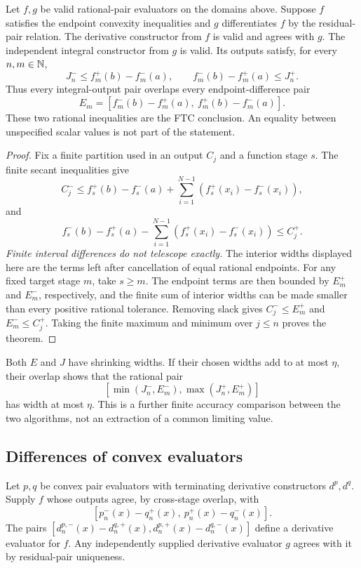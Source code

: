 \begin{theorem}
\label{thm:ftc-finite-output}
Let $f,g$ be valid rational-pair evaluators on the domains above.  Suppose
$f$ satisfies the endpoint convexity inequalities and $g$ differentiates
$f$ by the residual-pair relation.  The derivative constructor from $f$
is valid and agrees with $g$.  The independent integral constructor from
$g$ is valid.  Its outputs satisfy, for every $n,m\in\mathbb{N}$,
\[
 \boxed{J_n^-\le f_m^+(b)-f_m^-(a),\qquad
        f_m^-(b)-f_m^+(a)\le J_n^+.}
\]
Thus every integral-output pair overlaps every endpoint-difference pair
\[
 E_m=[f_m^-(b)-f_m^+(a),\ f_m^+(b)-f_m^-(a)].
\]
These two rational inequalities are the FTC conclusion.  An equality
between unspecified scalar values is not part of the statement.
\end{theorem}
\begin{proof}
Fix a finite partition used in an output $C_j$ and a function stage $s$.
The finite secant inequalities give
\[
 C_j^-\le f_s^+(b)-f_s^-(a)
          +\sum_{i=1}^{N-1}(f_s^+(x_i)-f_s^-(x_i)),
\]
and
\[
 f_s^-(b)-f_s^+(a)
          -\sum_{i=1}^{N-1}(f_s^+(x_i)-f_s^-(x_i))\le C_j^+.
\]
\emph{Finite interval differences do not telescope exactly.}  The
interior widths displayed here are the terms left after cancellation
of equal rational endpoints.  For any fixed target stage $m$, take
$s\ge m$.  The endpoint terms are then bounded by $E_m^+$ and $E_m^-$,
respectively, and the finite sum of interior widths can be made smaller
than every positive rational tolerance.  Removing slack gives
$C_j^-\le E_m^+$ and $E_m^-\le C_j^+$.
Taking the finite maximum and minimum over $j\le n$ proves the theorem.
\end{proof}

Both $E$ and $J$ have shrinking widths.  If their chosen widths add to
at most $\eta$, their overlap shows that the rational pair
\[
 [\min(J_n^-,E_m^-),\max(J_n^+,E_m^+)]
\]
has width at most $\eta$.  This is a further finite accuracy comparison
between the two algorithms, not an extraction of a common limiting value.

\subsection{Differences of convex evaluators}
Let $p,q$ be convex pair evaluators with terminating derivative constructors
$d^p,d^q$.  Supply $f$ whose outputs agree, by cross-stage overlap, with
\[
 [p_n^-(x)-q_n^+(x),\ p_n^+(x)-q_n^-(x)].
\]
The pairs
$[d_n^{p,-}(x)-d_n^{q,+}(x),d_n^{p,+}(x)-d_n^{q,-}(x)]$
define a derivative evaluator for $f$.  Any independently supplied
derivative evaluator $g$ agrees with it by residual-pair uniqueness.

